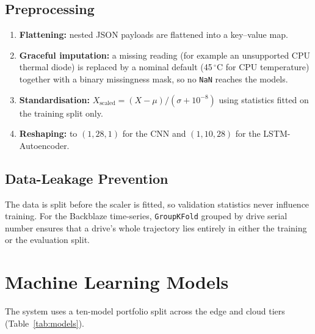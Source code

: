 \documentclass[12pt,a4paper]{report}
\begin{document}
\subsection{Preprocessing}
\begin{enumerate}
  \item \textbf{Flattening:} nested JSON payloads are flattened into a key--value map.
  \item \textbf{Graceful imputation:} a missing reading (for example an unsupported CPU thermal diode) is replaced by a nominal default (45\,$^\circ$C for CPU temperature) together with a binary missingness mask, so no \texttt{NaN} reaches the models.
  \item \textbf{Standardisation:} $X_{\text{scaled}} = (X-\mu)/(\sigma+10^{-8})$ using statistics fitted on the training split only.
  \item \textbf{Reshaping:} to $(1,28,1)$ for the CNN and $(1,10,28)$ for the LSTM-Autoencoder.
\end{enumerate}

\subsection{Data-Leakage Prevention}
The data is split before the scaler is fitted, so validation statistics never influence training. For the Backblaze time-series, \texttt{GroupKFold} grouped by drive serial number ensures that a drive's whole trajectory lies entirely in either the training or the evaluation split.

\section{Machine Learning Models}

The system uses a ten-model portfolio split across the edge and cloud tiers (Table~\ref{tab:models}).
\end{document}

